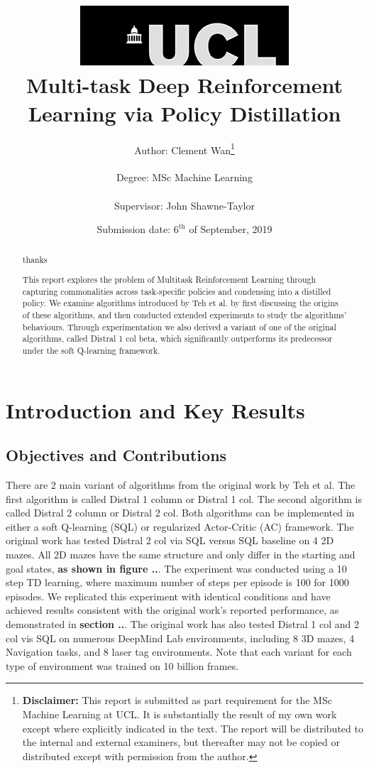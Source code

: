 \documentclass[12pt]{report}
\title{  	{ \includegraphics[scale=.5]{figs/ucl_logo.png}}\\
{{\Huge Multi-task Deep Reinforcement Learning via Policy Distillation}}\\
		}
\date{Submission date: $6^{\text{th}}$ of September, 2019}
\author{Author: Clement Wan\thanks{
{\bf Disclaimer:}
This report is submitted as part requirement for the MSc Machine Learning at UCL. It is
substantially the result of my own work except where explicitly indicated in the text. The report will be distributed to the internal and external examiners, but thereafter may not be copied or distributed except with permission from the author.
}
\\ \\
Degree: MSc Machine Learning\\ \\
Supervisor: John Shawne-Taylor}
\begin{document}
 
\onehalfspacing
\maketitle
\renewcommand{\abstractname}{Acknowledgements}
\begin{abstract}
 thanks
\end{abstract}
\renewcommand{\abstractname}{Abstract}
\begin{abstract}
This report explores the problem of Multitask Reinforcement Learning through capturing commonalities across task-specific policies and condensing into a distilled policy. We examine algorithms introduced by Teh et al. \cite{teh2017distral} by first discussing the origins of these algorithms, and then conducted extended experiments to study the algorithms' behaviours. Through experimentation we also derived a variant of one of the original algorithms, called Distral 1 col beta, which significantly outperforms its predecessor under the soft Q-learning framework.
\end{abstract}
\tableofcontents
\setcounter{page}{1}


\chapter{Introduction and Key Results}

\section{Objectives and Contributions}
There are 2 main variant of algorithms from the original work by Teh et al. The first algorithm is called Distral 1 column or Distral 1 col. The second algorithm is called Distral 2 column or Distral 2 col. Both algorithms can be implemented in either a soft Q-learning (SQL) or regularized Actor-Critic (AC) framework. The original work has tested Distral 2 col via SQL versus SQL baseline on 4 2D mazes. All 2D mazes have the same structure and only differ in the starting and goal states, \textbf{as shown in figure ..}. The experiment was conducted using a 10 step TD learning, where maximum number of steps per episode is 100 for 1000 episodes. We replicated this experiment with identical conditions and have achieved results consistent with the original work's reported performance, as demonstrated in \textbf{section ..}. The original work has also tested Distral 1 col and 2 col vis SQL on numerous DeepMind Lab environments, including 8 3D mazes, 4 Navigation tasks, and 8 laser tag environments. Note that each variant for each type of environment was trained on 10 billion frames.\\
\end{document}

